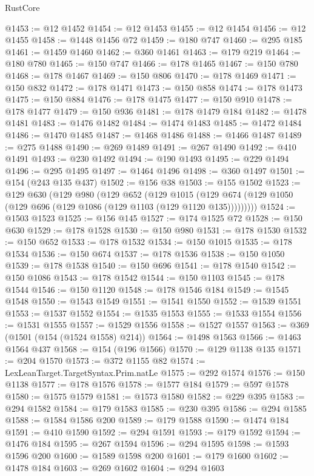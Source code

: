 \begin{lexlean}{RustCore}
\begin{coremodule}
@1453 := @12 @1452
@1454 := @12 @1453
@1455 := @12 @1454
@1456 := @12 @1455
@1458 := @1448 @1456 @72
@1459 := @180 @747
@1460 := @295 @185
@1461 := @1459 @1460
@1462 := @360 @1461
@1463 := @179 @219
@1464 := @180 @780
@1465 := @150 @747
@1466 := @178 @1465
@1467 := @150 @780
@1468 := @178 @1467
@1469 := @150 @806
@1470 := @178 @1469
@1471 := @150 @832
@1472 := @178 @1471
@1473 := @150 @858
@1474 := @178 @1473
@1475 := @150 @884
@1476 := @178 @1475
@1477 := @150 @910
@1478 := @178 @1477
@1479 := @150 @936
@1481 := @178 @1479 @184
@1482 := @1478 @1481
@1483 := @1476 @1482
@1484 := @1474 @1483
@1485 := @1472 @1484
@1486 := @1470 @1485
@1487 := @1468 @1486
@1488 := @1466 @1487
@1489 := @275 @1488
@1490 := @269 @1489
@1491 := @267 @1490
@1492 := @410 @1491
@1493 := @230 @1492
@1494 := @190 @1493
@1495 := @229 @1494
@1496 := @295 @1495
@1497 := @1464 @1496
@1498 := @360 @1497
@1501 := @154 (@243 @135 @437)
@1502 := @156 @38
@1503 := @155 @1502
@1523 := @129
    @630
    (@129
      @980
      (@129
        @652
        (@129
          @1015
          (@129 @674 (@129 @1050 (@129 @696 (@129 @1086 (@129 @1103 (@129 @1120 @135)))))))))
@1524 := @1503 @1523
@1525 := @156 @145
@1527 := @174 @1525 @72
@1528 := @150 @630
@1529 := @178 @1528
@1530 := @150 @980
@1531 := @178 @1530
@1532 := @150 @652
@1533 := @178 @1532
@1534 := @150 @1015
@1535 := @178 @1534
@1536 := @150 @674
@1537 := @178 @1536
@1538 := @150 @1050
@1539 := @178 @1538
@1540 := @150 @696
@1541 := @178 @1540
@1542 := @150 @1086
@1543 := @178 @1542
@1544 := @150 @1103
@1545 := @178 @1544
@1546 := @150 @1120
@1548 := @178 @1546 @184
@1549 := @1545 @1548
@1550 := @1543 @1549
@1551 := @1541 @1550
@1552 := @1539 @1551
@1553 := @1537 @1552
@1554 := @1535 @1553
@1555 := @1533 @1554
@1556 := @1531 @1555
@1557 := @1529 @1556
@1558 := @1527 @1557
@1563 := @369 (@1501 (@154 (@1524 @1558) @214))
@1564 := @1498 @1563
@1566 := @1463 @1564 @437
@1568 := @154 (@196 @1566)
@1570 := @129 @1138 @135
@1571 := @204 @1570
@1573 := @372 @1155 @82
@1574 := LexLeanTarget.TargetSyntax.Prim.natLe
@1575 := @292 @1574
@1576 := @150 @1138
@1577 := @178 @1576
@1578 := @1577 @184
@1579 := @597 @1578
@1580 := @1575 @1579
@1581 := @1573 @1580
@1582 := @229 @395
@1583 := @294 @1582
@1584 := @179 @1583
@1585 := @230 @395
@1586 := @294 @1585
@1588 := @1584 @1586 @200
@1589 := @179 @1588
@1590 := @1474 @184
@1591 := @410 @1590
@1592 := @294 @1591
@1593 := @179 @1592
@1594 := @1476 @184
@1595 := @267 @1594
@1596 := @294 @1595
@1598 := @1593 @1596 @200
@1600 := @1589 @1598 @200
@1601 := @179 @1600
@1602 := @1478 @184
@1603 := @269 @1602
@1604 := @294 @1603

\end{coremodule}
\end{lexlean}
